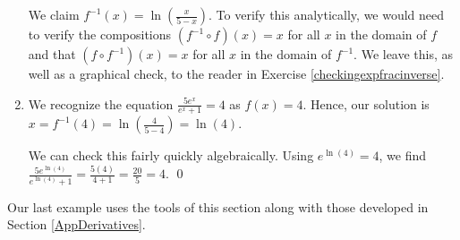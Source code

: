 \documentclass{ximera}
\begin{document}
\begin{ex}
\begin{enumerate}
We claim $f^{-1}(x) = \ln\left(\frac{x}{5-x}\right)$.  To verify this analytically, we would need to verify the compositions $\left(f^{-1} \circ f\right)(x) = x$ for all $x$ in the domain of $f$ and that $\left(f \circ f^{-1}\right)(x) = x$ for all $x$ in the domain of $f^{-1}$.   We leave this, as well as a graphical check, to the reader in Exercise \ref{checkingexpfracinverse}.




\item We recognize the equation $\frac{5e^{x}}{e^{x}+1} = 4$ as $f(x) = 4$.  Hence, our solution is $x = f^{-1}(4) = \ln\left(\frac{4}{5-4}\right) = \ln(4)$.  

We can check this fairly quickly algebraically.  Using  $e^{\ln(4)} = 4$, we find $\frac{5e^{\ln(4)}}{e^{\ln(4)}+1}  = \frac{5(4)}{4+1} = \frac{20}{5} = 4$. \qed

\end{enumerate}

\end{ex}

\pagebreak

Our last example uses the tools of this section along with those developed in Section \ref{AppDerivatives}.
\end{document}
